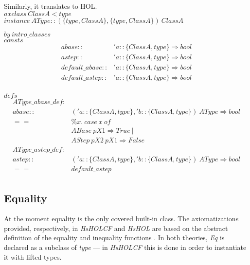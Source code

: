\documentclass[a4paper,12pt]{article}
\begin{document}
\noindent Similarly, it translates to HOL.\\

\noindent $axclass \ ClassA < type$\\

\noindent $instance \ AType::(\{type, ClassA\}, \{type, ClassA\}) \ ClassA$ 

$by \ intro\_classes$\\

\noindent $consts$
$$\begin{array}{ll}
abase :: & 'a::\{ClassA, type\} \Rightarrow bool\\
astep :: & 'a::\{ClassA, type\} \Rightarrow bool\\
default\_abase :: & 'a::\{ClassA, type\} \Rightarrow bool\\
default\_astep :: & 'a::\{ClassA, type\} \Rightarrow bool\\
\end{array}$$

\noindent $defs$
$$\begin{array}{rl}
AType\_abase\_def : & \\
   abase :: & ('a::\{ClassA, type\}, 'b::\{ClassA, type\}) \ AType \Rightarrow bool \\
                                   == & \% x. \ case \ x \ of \\
                                   &  ABase \ pX1 \Rightarrow True \ | \\
                                   &  AStep \ pX2 \ pX1 \Rightarrow False \\
AType\_astep\_def : & \\
      astep :: & ('a::\{ClassA, type\}, 'b::\{ClassA, type\}) \ AType \Rightarrow bool \\
      == & default\_astep\\
\end{array}$$

\subsection{Equality}

At the moment equality is the only covered built-in class.  The
axiomatizations provided, respectively, in \emph{HsHOLCF} and
\emph{HsHOL} are based on the abstract definition of the equality and
inequality functions \cite{HaskellRep}. In both theories, \emph{Eq} is
declared as a subclass of \emph{type} --- in \emph{HsHOLCF} this is
done in order to instantiate it with lifted types.\\
\end{document}

